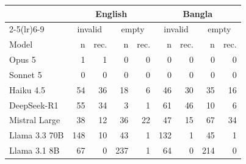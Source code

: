 \begin{tabular}{l rr rr rr rr}
\toprule
& \multicolumn{4}{c}{English} & \multicolumn{4}{c}{Bangla} \\
\cmidrule(lr){2-5}\cmidrule(lr){6-9}
& \multicolumn{2}{c}{invalid} & \multicolumn{2}{c}{empty} & \multicolumn{2}{c}{invalid} & \multicolumn{2}{c}{empty} \\
Model & n & rec. & n & rec. & n & rec. & n & rec. \\
\midrule
Opus 5 & 1 & 1 & 0 & 0 & 0 & 0 & 0 & 0 \\
Sonnet 5 & 0 & 0 & 0 & 0 & 0 & 0 & 0 & 0 \\
Haiku 4.5 & 54 & 36 & 18 & 6 & 46 & 30 & 35 & 16 \\
DeepSeek-R1 & 55 & 34 & 3 & 1 & 61 & 46 & 10 & 6 \\
Mistral Large & 38 & 12 & 36 & 22 & 47 & 15 & 67 & 34 \\
Llama 3.3 70B & 148 & 10 & 43 & 1 & 132 & 1 & 45 & 1 \\
Llama 3.1 8B & 67 & 0 & 237 & 1 & 64 & 0 & 214 & 0 \\
\bottomrule
\end{tabular}
